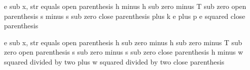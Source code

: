 e sub x, str equals open parenthesis h minus h sub zero minus T sub zero open parenthesis s minus s sub zero close parenthesis plus k e plus p e squared close parenthesis

e sub x, str equals open parenthesis h sub zero minus h sub zero minus T sub zero open parenthesis s sub zero minus s sub zero close parenthesis h minus w squared divided by two plus w squared divided by two close parenthesis